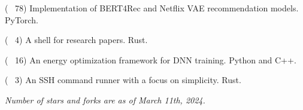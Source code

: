 
\begin{cvlist}

  \cvlistitem
    {\href{https://github.com/jaywonchung/BERT4Rec-VAE-Pytorch}{} 
    {\normalfont( \faCodeFork~78)}} %
    {Implementation of BERT4Rec and Netflix VAE recommendation models. PyTorch.} %

  \cvlistitem
    {\href{https://github.com/jaywonchung/reason}{}
    {\normalfont( \faCodeFork~4)}} %
    {A shell for research papers. Rust.} %

  \cvlistitem
    {\href{https://github.com/SymbioticLab/Zeus}{}
    {\normalfont( \faCodeFork~16)}} %
    {An energy optimization framework for DNN training. Python and C++.} %

  \cvlistitem
    {\href{https://github.com/jaywonchung/pegasus}{}
    {\normalfont( \faCodeFork~3)}} %
    {An SSH command runner with a focus on simplicity. Rust.} %

\end{cvlist}

\vspace{-5mm}

\begin{cvparagraph}
\textit{Number of stars and forks are as of March 11th, 2024.}
\end{cvparagraph}
